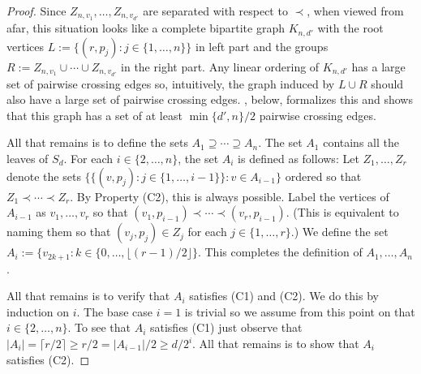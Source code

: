 \documentclass[kpfonts]{patmorin}
\renewcommand{\ge}{\geqslant}
\begin{document}
\begin{proof}
    Since $Z_{n,v_1},\ldots,Z_{n,v_{d'}}$ are separated with respect to $\prec$, when viewed from afar, this situation looks like a complete bipartite graph $K_{n,d'}$ with the root vertices $L:=\{(r,p_j):j\in\{1,\ldots,n\}\}$ in left part and the groups $R:=Z_{n,v_1}\cup\cdots\cup Z_{n,v_{d'}}$ in the right part.  Any linear ordering of $K_{n,d'}$ has a large set of pairwise crossing edges so, intuitively, the graph induced by $L\cup R$ should also have a large set of pairwise crossing edges. , below, formalizes this and shows that this graph has a set of at least $\min\{d',n\}/2$ pairwise crossing edges.

    All that remains is to define the sets $A_1\supseteq\cdots\supseteq A_n$.  The set $A_1$ contains all the leaves of $S_d$.  For each $i\in\{2,\ldots,n\}$, the set $A_i$ is defined as follows:  Let $Z_1,\ldots,Z_r$ denote the sets $\{\{(v,p_j):j\in\{1,\ldots,i-1\}\}:v\in A_{i-1}\}$ ordered so that $Z_1\prec\cdots\prec Z_r$.  By Property (C2), this is always possible.	Label the vertices of $A_{i-1}$ as $v_1,\ldots,v_r$ so that $(v_1,p_{i-1})\prec\cdots\prec (v_r,p_{i-1})$.   (This is equivalent to naming them so that $(v_j,p_j)\in Z_j$ for each $j\in\{1,\ldots,r\}$.)  We define the set $A_i:=\{v_{2k+1}:k\in\{0,\ldots,\lfloor(r-1)/2\rfloor\}$.  This completes the definition of $A_1,\ldots,A_n$.

	All that remains is to verify that $A_i$ satisfies (C1) and (C2).  We do this by induction on $i$. The base case $i=1$ is trivial so we assume from this point on that $i\in\{2,\ldots,n\}$.   To see that $A_i$ satisfies (C1) just observe that $|A_i|=\lceil r/2\rceil \ge r/2= |A_{i-1}|/2\ge d/2^{i}$.  All that remains is to show that $A_i$ satisfies (C2).


\end{proof}
\end{document}
